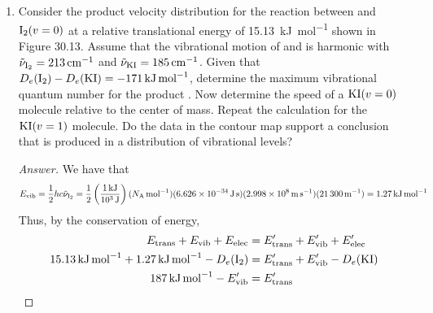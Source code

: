 \documentclass[../psets.tex]{subfiles}
\begin{document}
\begin{enumerate}[label={\textbf{30-\arabic*.}},leftmargin=3.5em]
\begin{proof}[Answer]
\begin{center}
        \end{center}
    \end{proof}
    \setcounter{enumi}{30}
    \item Consider the product velocity distribution for the reaction between  and $\ce{I2}(v=0)$ at a relative translational energy of \SI{15.13}{\kilo\joule\per\mole} shown in Figure 30.13. Assume that the vibrational motion of  and  is harmonic with $\tilde{\nu}_{\ce{I2}}=\SI{213}{\per\centi\meter}$ and $\tilde{\nu}_{\ce{KI}}=\SI{185}{\per\centi\meter}$. Given that $D_e(\ce{I2})-D_e(\ce{KI})=\SI{-171}{\kilo\joule\per\mole}$, determine the maximum vibrational quantum number for the product . Now determine the speed of a $\ce{KI}(v=0)$ molecule relative to the center of mass. Repeat the calculation for the $\ce{KI}(v=1)$ molecule. Do the data in the contour map support a conclusion that  is produced in a distribution of vibrational levels?
    \begin{proof}[Answer]
        We have that
        \begin{equation*}
            E_\text{vib} = \frac{1}{2}hc\tilde{\nu}_{\ce{I2}}
            = \frac{1}{2}\left( \frac{\SI{1}{\kilo\joule}}{\SI{e3}{\joule}} \right)(\NA\,\si{\per\mole})(\SI{6.626e-34}{\joule\second})(\SI{2.998e8}{\meter\per\second})(\SI{21300}{\per\meter})
            = \SI{1.27}{\kilo\joule\per\mole}
        \end{equation*}
        Thus, by the conservation of energy,
        \begin{align*}
            E_\text{trans}+E_\text{vib}+E_\text{elec} &= E_\text{trans}'+E_\text{vib}'+E_\text{elec}'\\
            \SI{15.13}{\kilo\joule\per\mole}+\SI{1.27}{\kilo\joule\per\mole}-D_e(\ce{I2}) &= E_\text{trans}'+E_\text{vib}'-D_e(\ce{KI})\\
            \SI{187}{\kilo\joule\per\mole}-E_\text{vib}' &= E_\text{trans}'

\end{align*}
\end{proof}
\end{enumerate}
\end{document}
